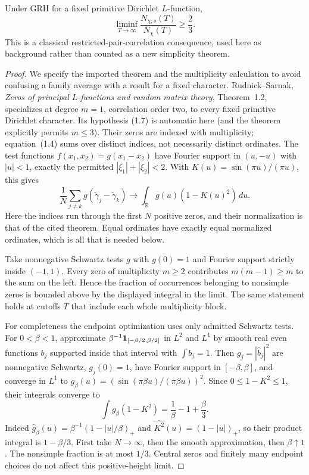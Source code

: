 \begin{lemma}
Under GRH for a fixed primitive Dirichlet $L$-function,
\[
 \liminf_{T\to\infty}\frac{N_{\chi,s}(T)}{N_\chi(T)}\ge\frac23.
\]
This is a classical restricted-pair-correlation consequence, used here
as background rather than counted as a new simplicity theorem.
\end{lemma}
\begin{proof}
We specify the imported theorem and the multiplicity calculation to
avoid confusing a family average with a result for a fixed character.
Rudnick--Sarnak, \emph{Zeros of principal $L$-functions and random
matrix theory}, Theorem~1.2, specializes at degree $m=1$, correlation
order two, to every fixed primitive Dirichlet character. Its hypothesis
(1.7) is automatic here (and the theorem explicitly permits $m\le3$).
Their zeros are indexed with multiplicity; equation~(1.4) sums over
distinct indices, not necessarily distinct ordinates. The test functions
$f(x_1,x_2)=g(x_1-x_2)$ have Fourier support in
$(u,-u)$ with $|u|<1$, exactly the permitted
$|\xi_1|+|\xi_2|<2$. With $K(u)=\sin(\pi u)/(\pi u)$, this gives
\[
 \frac1N\sum_{j\ne k}g(\widetilde\gamma_j-
                         \widetilde\gamma_k)
 \longrightarrow\int_{\mathbb R}g(u)(1-K(u)^2)\,du.
\]
Here the indices run through the first $N$ positive zeros, and their
normalization is that of the cited theorem. Equal ordinates have
exactly equal normalized ordinates, which is all that is needed below.

Take nonnegative Schwartz tests $g$ with $g(0)=1$ and Fourier support
strictly inside $(-1,1)$. Every zero of multiplicity $m\ge2$ contributes
$m(m-1)\ge m$ to the sum on the left. Hence the fraction of occurrences
belonging to nonsimple zeros is bounded above by the displayed integral
in the limit. The same statement holds at cutoffs $T$ that include each
whole multiplicity block.

For completeness the endpoint optimization uses only admitted
Schwartz tests. For $0<\beta<1$, approximate
$\beta^{-1}{\bf1}_{[-\beta/2,\beta/2]}$ in $L^2$ and $L^1$ by
smooth real even functions $b_j$ supported inside that interval with
$\int b_j=1$. Then $g_j=|\widehat b_j|^2$ are nonnegative Schwartz,
$g_j(0)=1$, have Fourier support in $[-\beta,\beta]$, and converge in
$L^1$ to $g_\beta(u)=(\sin(\pi\beta u)/(\pi\beta u))^2$.
Since $0\le1-K^2\le1$, their integrals converge to
\[
 \int g_\beta(1-K^2)
 =\frac1\beta-1+\frac\beta3.
\]
Indeed $\widehat g_\beta(u)=\beta^{-1}(1-|u|/\beta)_+$ and
$\widehat {K^2}(u)=(1-|u|)_+$, so their product integral is
$1-\beta/3$. First take $N\to\infty$, then the smooth approximation,
then $\beta\uparrow1$. The nonsimple fraction is at most $1/3$.
Central zeros and finitely many endpoint choices do not affect this
positive-height limit.
\end{proof}

